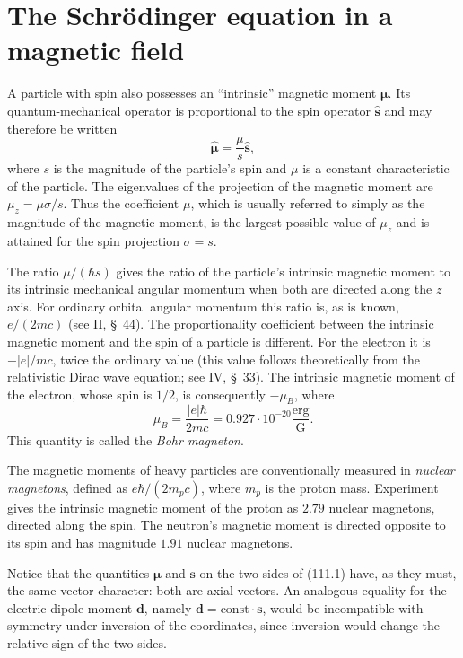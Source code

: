 \section{The Schrödinger equation in a magnetic field}

A particle with spin also possesses an ``intrinsic'' magnetic moment
$\boldsymbol\mu$. Its quantum-mechanical operator is proportional to the spin
operator $\hat{\mathbf s}$ and may therefore be written
\begin{equation}
 \hat{\boldsymbol\mu}=\frac{\mu}{s}\hat{\mathbf s},
 \tag{111.1}
\end{equation}
where $s$ is the magnitude of the particle's spin and $\mu$ is a constant
characteristic of the particle. The eigenvalues of the projection of the
magnetic moment are $\mu_z=\mu\sigma/s$. Thus the coefficient $\mu$, which is
usually referred to simply as the magnitude of the magnetic moment, is the
largest possible value of $\mu_z$ and is attained for the spin projection
$\sigma=s$.

The ratio $\mu/(\hbar s)$ gives the ratio of the particle's intrinsic magnetic
moment to its intrinsic mechanical angular momentum when both are directed
along the $z$ axis. For ordinary orbital angular momentum this ratio is, as is
known, $e/(2mc)$ (see II, \S~44). The proportionality coefficient between the
intrinsic magnetic moment and the spin of a particle is different. For the
electron it is $-|e|/mc$, twice the ordinary value (this value follows
theoretically from the relativistic Dirac wave equation; see IV, \S~33). The
intrinsic magnetic moment of the electron, whose spin is $1/2$, is consequently
$-\mu_B$, where
\begin{equation}
 \mu_B=\frac{|e|\hbar}{2mc}=0.927\cdot10^{-20}\frac{\text{erg}}{\text{G}}.
 \tag{111.2}
\end{equation}
This quantity is called the \emph{Bohr magneton}.

The magnetic moments of heavy particles are conventionally measured in
\emph{nuclear magnetons}, defined as $e\hbar/(2m_pc)$, where $m_p$ is the
proton mass. Experiment gives the intrinsic magnetic moment of the proton as
$2.79$ nuclear magnetons, directed along the spin. The neutron's magnetic
moment is directed opposite to its spin and has magnitude $1.91$ nuclear
magnetons.

Notice that the quantities $\boldsymbol\mu$ and $\mathbf s$ on the two sides
of (111.1) have, as they must, the same vector character: both are axial
vectors. An analogous equality for the electric dipole moment $\mathbf d$,
namely $\mathbf d=\mathrm{const}\cdot\mathbf s$, would be incompatible with
symmetry under inversion of the coordinates, since inversion would change the
relative sign of the two sides.

